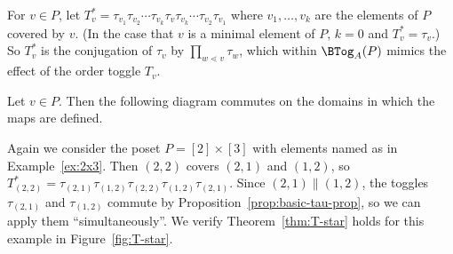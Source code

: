 \begin{defi}
For $v\in P$, let $T_v^* =\tau_{v_1}\tau_{v_2}\cdots \tau_{v_k} \tau_v \tau_{v_k}\cdots
\tau_{v_2}\tau_{v_1}$ where $v_1,\dots,v_k$ are the elements of $P$ covered by $v$. (In the
case that $v$ is a minimal element of $P$, $k=0$ and $T_v^*=\tau_v$.) So $T_v^*$ is the
conjugation of $\tau_{v}$ by $\prod_{w\lessdot v}\tau_{w}$, which within $\BTog_{A}(P)$ mimics the effect of
the order toggle $T_{v}$. 

\end{defi}

\begin{theo}\label{thm:T-star}
Let $v\in P$. Then the following diagram commutes on the domains in which the maps are defined.
\begin{center}
\end{center}
\end{theo}

\begin{exam}\label{ex:T-star}
Again we consider the poset $P=[2]\times[3]$ with elements named as in Example~\ref{ex:2x3}.
Then $(2,2)$ covers $(2,1)$ and $(1,2)$, so
$T_{(2,2)}^*=\tau_{(2,1)}\tau_{(1,2)} \tau_{(2,2)} \tau_{(1,2)}\tau_{(2,1)}$.
Since
$(2,1)\parallel (1,2)$, the toggles $\tau_{(2,1)}$ and $\tau_{(1,2)}$ commute by
Proposition~\ref{prop:basic-tau-prop}, so we can apply them ``simultaneously''.
We verify
Theorem~\ref{thm:T-star} holds for this example in Figure~\ref{fig:T-star}.
\end{exam}

